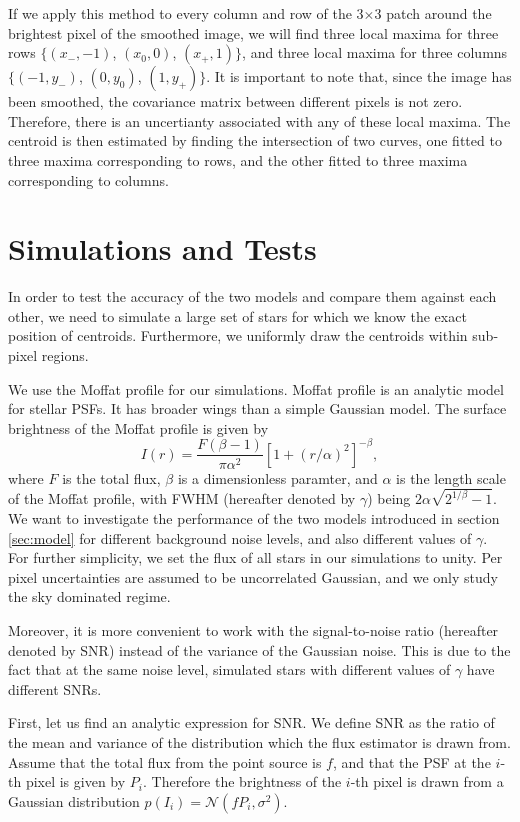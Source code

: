 \documentclass[12pt, preprint]{aastex}
\newcommand{\beq}{\begin{equation}}
\newcommand{\eeq}{\end{equation}}
\begin{document}
If we apply this method to every column and row of the 3$\times$3 patch around the brightest pixel of the smoothed image, we will find three local maxima for three rows $\{(x_{-},-1)$, $(x_{0},0)$, $(x_{+},1)\}$, and three local maxima for three columns $\{(-1,y_{-})$, $(0,y_{0})$, $(1,y_{+})\}$. It is important to note that, since the image has been smoothed, the covariance matrix between different pixels is not zero. Therefore, there is an uncertianty associated with any of these local maxima. The centroid is then estimated by finding the intersection of two curves, one fitted to three maxima corresponding to rows, and the other fitted to three maxima corresponding to columns.
\section{Simulations and Tests}\label{sec:data}

In order to test the accuracy of the two models and compare them against each other, we need to simulate a large set of stars for which we know the exact position of centroids. Furthermore, we uniformly draw the centroids within sub-pixel regions. 

We use the Moffat profile \citep{moffat} for our simulations. Moffat profile is an analytic model for stellar PSFs. It has broader wings than a simple Gaussian model. The surface brightness of the Moffat profile is given by
\beq
I(r) = \frac{F(\beta -1)}{\pi \alpha^{2}}[1+(r/\alpha)^{2}]^{-\beta},
\label{mof}
\eeq
where $F$ is the total flux, $\beta$ is a dimensionless paramter, and $\alpha$ is the length scale of the Moffat profile, with FWHM (hereafter denoted by $\gamma$) being $2\alpha\sqrt{2^{1/\beta}-1}$. 
We want to investigate the performance of the two models introduced in section \ref{sec:model} for different background noise levels, and also different values of $\gamma$. For further simplicity, we set the flux of all stars in our simulations to unity. Per pixel uncertainties are assumed to be uncorrelated Gaussian, and we only study the sky dominated regime.

Moreover, it is more convenient to work with the signal-to-noise ratio (hereafter denoted by SNR) instead of the variance of the Gaussian noise. This is due to the fact that at the same noise level, simulated stars with different values of $\gamma$ have different SNRs. 

First, let us find an analytic expression for SNR. We define SNR as the ratio of the mean and variance of the distribution which the flux estimator is drawn from. Assume that the total flux from the point source is $f$, and that the PSF at the $i$-th pixel is given by $P_{i}$. Therefore the brightness of the $i$-th pixel is drawn from a Gaussian distribution $p(I_{i}) = \mathcal{N}(fP_{i},\sigma^{2})$. 
\end{document}
